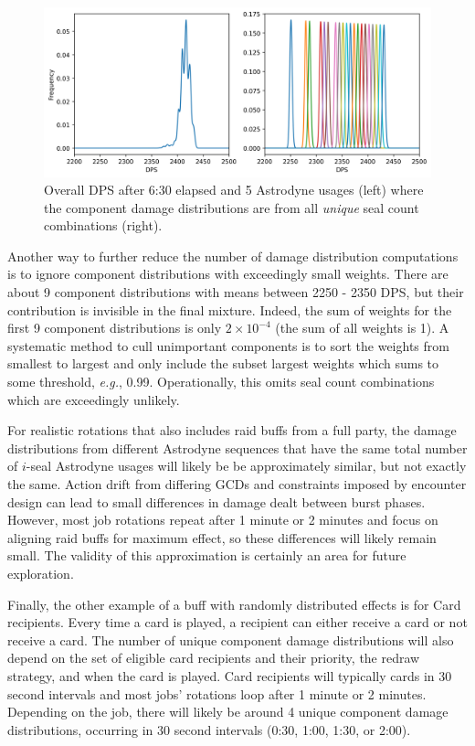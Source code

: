 \documentclass{article}
\begin{document}
    \begin{figure}[H]
        \centering
        \includegraphics[width=0.95\linewidth]{img/astrodyne-unique.PNG}
        \caption{Overall DPS after 6:30 elapsed and 5 Astrodyne usages (left) where the component damage distributions are from all \textit{unique} seal count combinations (right).}\label{fig:random-buff-unique}
    \end{figure}
    Another way to further reduce the number of damage distribution computations is to ignore component distributions with exceedingly small weights. There are about 9 component distributions with means between 2250 - 2350 DPS, but their contribution is invisible in the final mixture. Indeed, the sum of weights for the first 9 component distributions is only $2 \times 10^{-4}$ (the sum of all weights is 1). A systematic method to cull unimportant components is to sort the weights from smallest to largest and only include the subset largest weights which sums to some threshold, \textit{e.g.}, 0.99. Operationally, this omits seal count combinations which are exceedingly unlikely.
    
    For realistic rotations that also includes raid buffs from a full party, the damage distributions from different Astrodyne sequences that have the same total number of $i$-seal Astrodyne usages will likely be be approximately similar, but not exactly the same. Action drift from differing GCDs and constraints imposed by encounter design can lead to small differences in damage dealt between burst phases. However, most job rotations repeat after 1 minute or 2 minutes and focus on aligning raid buffs for maximum effect, so these differences will likely remain small. The validity of this approximation is certainly an area for future exploration.
    
    Finally, the other example of a buff with randomly distributed effects is for Card recipients. Every time a card is played, a recipient can either receive a card or not receive a card. The number of unique component damage distributions will also depend on the set of eligible card recipients and their priority, the redraw strategy, and when the card is played. Card recipients will typically cards in 30 second intervals and most jobs' rotations loop after 1 minute or 2 minutes. Depending on the job, there will likely be around 4 unique component damage distributions, occurring in 30 second intervals (0:30, 1:00, 1:30, or 2:00).
\end{document}
